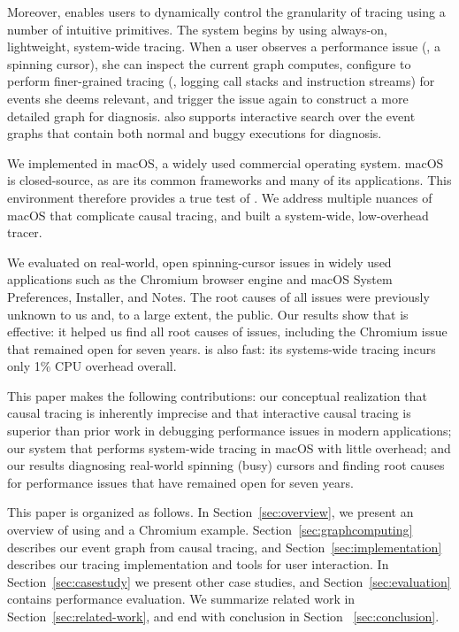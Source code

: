 Moreover, \xxx enables users to dynamically control the granularity of tracing
using a number of intuitive primitives. The system begins by using always-on,
lightweight, system-wide tracing.  When a user observes a performance issue
(\eg, a spinning cursor), she can inspect the current graph \xxx computes,
configure \xxx to perform finer-grained tracing (\eg, logging call stacks and
instruction streams) for events she deems relevant, and trigger the issue again
to construct a more detailed graph for diagnosis.  \xxx also supports
interactive search over the event graphs that contain both normal and buggy
executions for diagnosis.

We implemented \xxx in macOS, a widely used commercial operating system. macOS
is closed-source, as are its common frameworks and many of its applications.
This environment therefore provides a true test of \xxx.  We address multiple
nuances of macOS that complicate causal tracing, and built a system-wide,
low-overhead tracer.

We evaluated \xxx on \nbug real-world, open spinning-cursor issues in widely
used applications such as the Chromium browser engine and macOS System
Preferences, Installer, and Notes.  The root causes of all \nbug issues were
previously unknown to us and, to a large extent, the public. Our results show
that \xxx is effective: it helped us find all root causes of issues, including
the Chromium issue that remained open for seven years.  \xxx is also fast: its
systems-wide tracing incurs only 1\% CPU overhead overall.

This paper makes the following contributions: our conceptual realization that
causal tracing is inherently imprecise and that interactive causal tracing is
superior than prior work in debugging performance issues in modern
applications; our system \xxx that performs system-wide tracing in macOS with
little overhead; and our results diagnosing real-world spinning (busy) cursors
and finding root causes for performance issues that have remained open for
seven years.

This paper is organized as follows. In Section~\ref{sec:overview}, we present
an overview of using \xxx and a Chromium example.
Section~\ref{sec:graphcomputing} describes our event graph from causal tracing,
and Section~\ref{sec:implementation} describes our
tracing implementation and tools for user interaction.
In Section~\ref{sec:casestudy} we present other case
studies, and Section~\ref{sec:evaluation} contains performance evaluation.
We summarize related work in Section~\ref{sec:related-work}, and end with
conclusion in Section ~\ref{sec:conclusion}.
